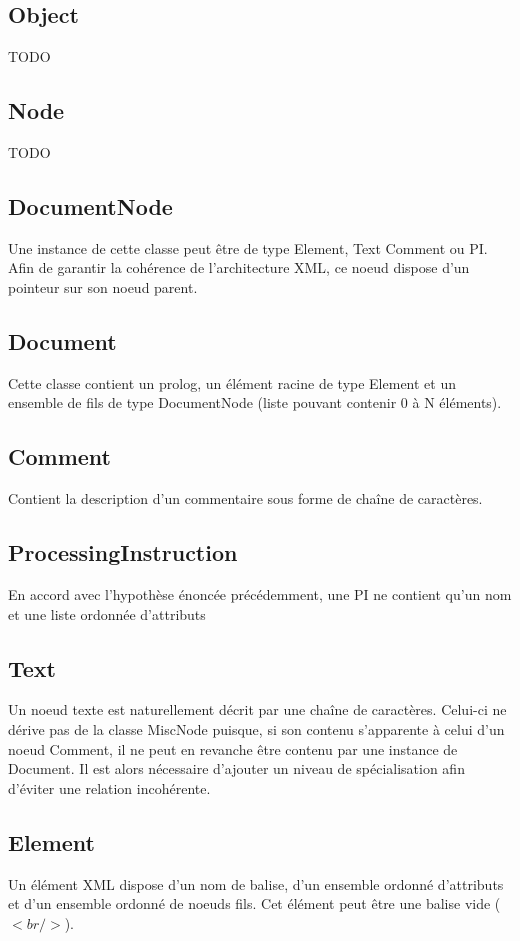     \subsection{Object}
        TODO

    \subsection{Node}
        TODO

    \subsection{DocumentNode}
        Une instance de cette classe peut être de type Element, Text Comment ou PI. Afin de garantir la cohérence de l'architecture XML, ce noeud dispose d'un pointeur sur son noeud parent.

    \subsection{Document}
        Cette classe contient un prolog, un élément racine de type Element et un ensemble de fils de type DocumentNode (liste pouvant contenir 0 à N éléments).

    \subsection{Comment}
        Contient la description d'un commentaire sous forme de chaîne de caractères.

    \subsection{ProcessingInstruction}
        En accord avec l'hypothèse énoncée précédemment, une PI ne contient qu'un nom et une liste ordonnée d'attributs

    \subsection{Text}
        Un noeud texte est naturellement décrit par une chaîne de caractères. Celui-ci ne dérive pas de la classe MiscNode puisque, si son contenu s'apparente à celui d'un noeud Comment, il ne peut en revanche être contenu par une instance de Document. Il est alors nécessaire d'ajouter un niveau de spécialisation afin d'éviter une relation incohérente.

    \subsection{Element}
        Un élément XML dispose d'un nom de balise, d'un ensemble ordonné d'attributs et d'un ensemble ordonné de noeuds fils. Cet élément peut être une balise vide ($<br/>$).
